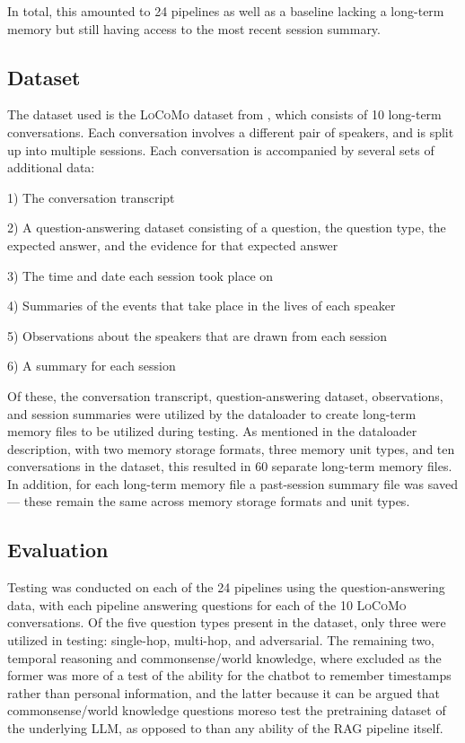 In total, this amounted to 24 pipelines as well as a baseline lacking a long-term memory but still having access to the most recent session summary.



\subsection{Dataset}

The dataset used is the \textsc{LoCoMo} dataset from \cite{Maharana2024}, which consists of 10 long-term conversations. Each conversation involves a different pair of speakers, and is split up into multiple sessions. Each conversation is accompanied by several sets of additional data: 

\begin{displayquote}
1) The conversation transcript

2) A question-answering dataset consisting of a question, the question type, the expected answer, and the evidence for that expected answer

3) The time and date each session took place on

4) Summaries of the events that take place in the lives of each speaker

5) Observations about the speakers that are drawn from each session

6) A summary for each session
\end{displayquote}

\noindent Of these, the conversation transcript, question-answering dataset, observations, and session summaries were utilized by the dataloader to create long-term memory files to be utilized during testing. As mentioned in the dataloader description, with two memory storage formats, three memory unit types, and ten conversations in the dataset, this resulted in 60 separate long-term memory files. In addition, for each long-term memory file a past-session summary file was saved — these remain the same across memory storage formats and unit types.



\subsection{Evaluation}

Testing was conducted on each of the 24 pipelines using the question-answering data, with each pipeline answering questions for each of the 10 \textsc{LoCoMo} conversations. Of the five question types present in the dataset, only three were utilized in testing: single-hop, multi-hop, and adversarial. The remaining two, temporal reasoning and commonsense/world knowledge, where excluded as the former was more of a test of the ability for the chatbot to remember timestamps rather than personal information, and the latter because it can be argued that commonsense/world knowledge questions moreso test the pretraining dataset of the underlying LLM, as opposed to than any ability of the RAG pipeline itself. 


